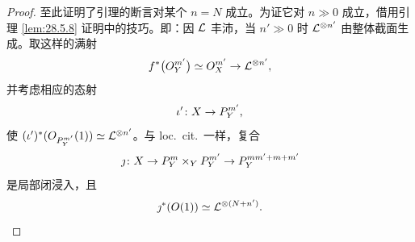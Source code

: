 \begin{proof}
至此证明了引理的断言对某个 $n=N$ 成立。为证它对 $n\gg 0$ 成立，借用引理 \ref{lem:28.5.8} 证明中的技巧。即：因 $\mathcal{L}$ 丰沛，当 $n'\gg 0$ 时 $\mathcal{L}^{\otimes n'}$ 由整体截面生成。取这样的满射
\[
f^*\bigl(O_Y^{m'}\bigr)\simeq O_X^{m'}\to\mathcal{L}^{\otimes n'},
\]
并考虑相应的态射
\[
\iota'\colon X\to P^{m'}_Y,
\]
使 $(\iota')^*(O_{P^{m'}_Y}(1))\simeq\mathcal{L}^{\otimes n'}$。与 loc.\ cit.\ 一样，复合
\[
\jmath\colon X\to P^m_Y\times_YP^{m'}_Y\to P^{mm'+m+m'}_Y
\]
是局部闭浸入，且
\[
\jmath^*(O(1))\simeq\mathcal{L}^{\otimes(N+n')}.
\]
\end{proof}
